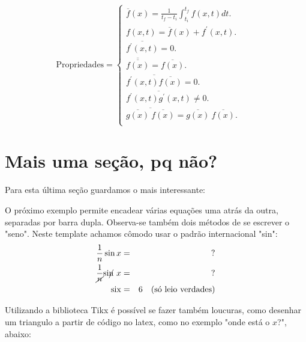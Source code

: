 \begin{equation}
	\label{ola}
	\text{Propriedades}=
	\begin{cases}
		\overline{f}({x})=\frac{1}{t_f - t_i} \int_{t_i}^{t_f} f({x} , t) dt.      & \quad  \\
		f({x} , t) = \overline{f}({x}) + f^\prime ({x} ,t) . & \quad   \\
		\overline{f^\prime ({x} ,t)} = 0 . & \quad   \\
		\overline{\overline{f({x})}} = \overline{f({x})} . & \quad   \\
		\overline{f^\prime ({x} ,t)\overline{f({x})}} = 0 .& \quad   \\
		\overline{f^\prime ({x} ,t)g^\prime ({x} ,t)} \neq 0 . & \quad   \\
		\overline{  \overline{g({x})} \ \overline{f({x})}  } = {\overline{g({x})}} \ {\overline{f({x})}} . & \quad   \\
	\end{cases}
\end{equation}

\section{Mais uma seção, pq não?}

Para esta última seção guardamos o mais interessante:


O próximo exemplo permite encadear várias equações uma atrás da outra, separadas por barra dupla. Observa-se também dois métodos de se escrever o "seno". Neste template achamos cômodo usar o padrão internacional "sin":
\begin{eqnarray}
	\frac{1}{n} \sin x & = & \mathrm{?} \\
	\frac{1}{\cancel{n}} \mathrm{si}\cancel{\mathrm{n}} ~x & = & \mathrm{?} \\
	\mathrm{six} & = & 6 \quad \text{(só leio verdades)}
\end{eqnarray}

Utilizando a biblioteca Tikx é possível se fazer também loucuras, como desenhar um triangulo a partir de código no latex, como no exemplo "onde está o $x$?", abaixo:

\begin{figure}[h!]
	\centering
{}
\end{figure}

